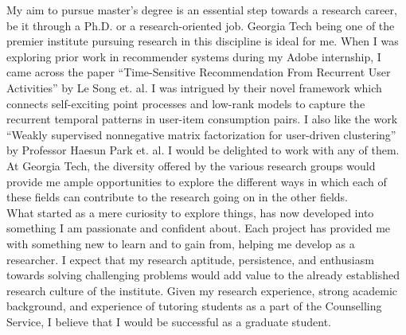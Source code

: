\documentclass[letterpaper]{article}
\newcommand{\univShort}{Georgia Tech}
\newcommand{\univSpecifics}{
	Georgia Tech being one of the premier institute pursuing research in this discipline is ideal for me. When I was exploring prior work in recommender systems during my Adobe internship, I came across the paper ``Time-Sensitive Recommendation From
	Recurrent User Activities'' by Le Song et. al. I was intrigued by their novel framework which connects self-exciting point processes and low-rank models to capture the recurrent temporal patterns in user-item consumption pairs. I also like the work ``Weakly supervised nonnegative matrix factorization for user-driven clustering'' by Professor Haesun Park et. al. I would be delighted to work with any of them. At \univShort, the diversity offered by the various research groups would provide me ample opportunities to explore the different ways in which each of these fields can contribute to the research going on in the other fields.
}
\begin{document}
My aim to pursue master’s degree is an essential step towards a research career, be it through a Ph.D. or a research-oriented job.\univSpecifics \\
	
What started as a mere curiosity to explore things, has now developed into something I am passionate and confident about. Each project has provided me with something new to learn and to gain from, helping me develop as a researcher. I expect that my research aptitude, persistence, and enthusiasm towards solving challenging problems would add value to the already established research culture of the institute. Given my research experience, strong academic background, and experience of tutoring students as a part of the Counselling Service, I believe that I would be successful as a graduate student.
\end{document}
